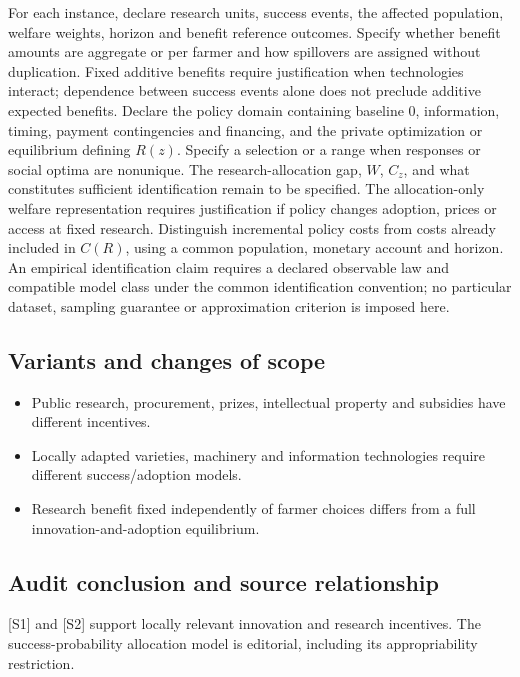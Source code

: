\documentclass[11pt,a4paper]{article}
\begin{document}
For each instance, declare research units, success events, the affected population, welfare weights, horizon and benefit reference outcomes. Specify whether benefit amounts are aggregate or per farmer and how spillovers are assigned without duplication. Fixed additive benefits require justification when technologies interact; dependence between success events alone does not preclude additive expected benefits. Declare the policy domain containing baseline \(0\), information, timing, payment contingencies and financing, and the private optimization or equilibrium defining \(R(z)\). Specify a selection or a range when responses or social optima are nonunique. The research-allocation gap, \(W\), \(C_z\), and what constitutes sufficient identification remain to be specified. The allocation-only welfare representation requires justification if policy changes adoption, prices or access at fixed research. Distinguish incremental policy costs from costs already included in \(C(R)\), using a common population, monetary account and horizon. An empirical identification claim requires a declared observable law and compatible model class under the common identification convention; no particular dataset, sampling guarantee or approximation criterion is imposed here.

\subsection*{Variants and changes of scope}

\begin{itemize}
\item Public research, procurement, prizes, intellectual property and subsidies have different incentives.
\item Locally adapted varieties, machinery and information technologies require different success/adoption models.
\item Research benefit fixed independently of farmer choices differs from a full innovation-and-adoption equilibrium.
\end{itemize}

\subsection*{Audit conclusion and source relationship}

[S1] and [S2] support locally relevant innovation and research incentives. The success-probability allocation model is editorial, including its appropriability restriction.
\end{document}
